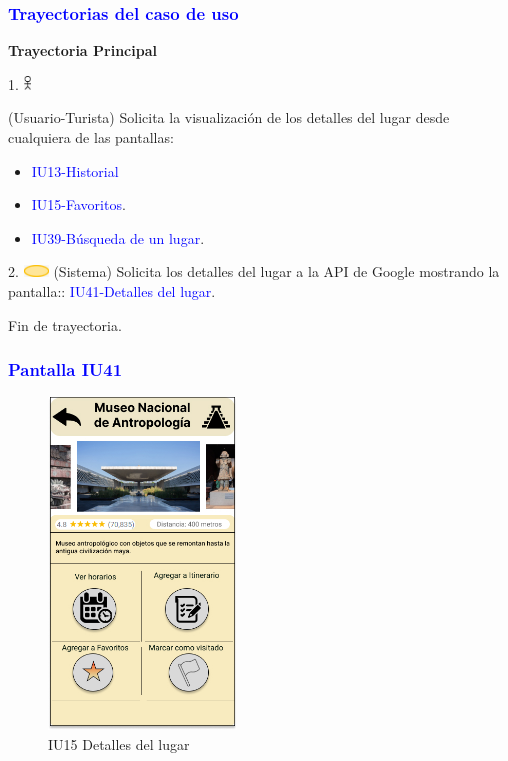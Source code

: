 \pagebreak
\subsubsection{\textcolor{blue}{Trayectorias del caso de uso}}
\textbf{Trayectoria Principal}{

     1. \includegraphics[width=0.0150\textwidth]{Figuras/persona.png}{
        (Usuario-Turista)
        Solicita la visualización de los detalles del lugar desde cualquiera de las pantallas: 
            \begin{itemize}
                \item \textcolor{blue}{IU13-Historial}
                \item \textcolor{blue}{IU15-Favoritos}.
                \item \textcolor{blue}{IU39-Búsqueda de un lugar}.
            \end{itemize}
     }
    
      2. \includegraphics[width=0.0500\textwidth]{Figuras/sistema.png} {
        (Sistema) 
        Solicita los detalles del lugar a la API de Google mostrando la pantalla:: \textcolor{blue}{IU41-Detalles del lugar}.
      }

      Fin de trayectoria.
}

\par
\vspace{1cm}

\subsubsection{\textcolor{blue}{Pantalla IU41}}

    \begin{figure}[htb]
        \centering
        \includegraphics[width= 5cm]{Pantallas Prototipo3/IU41-Detalles del lugar.jpg}
        \caption{IU15 Detalles del lugar}
        \label{fig:enter-label}
    \end{figure}

